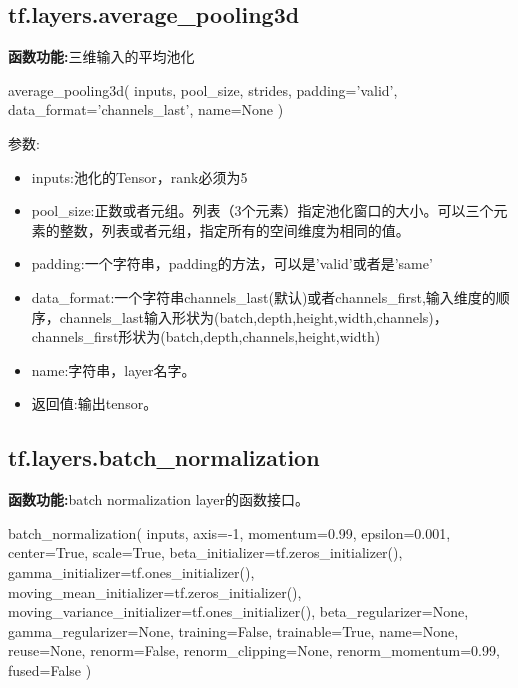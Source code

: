 \subsection{tf.layers.average\_pooling3d}
\textbf{函数功能:}三维输入的平均池化
\begin{python}
average_pooling3d(
    inputs,
    pool_size,
    strides,
    padding='valid',
    data_format='channels_last',
    name=None
)
\end{python}
参数:
\begin{itemize}
	\item inputs:池化的Tensor，rank必须为5
	\item pool\_size:正数或者元组。列表（3个元素）指定池化窗口的大小。可以三个元素的整数，列表或者元组，指定所有的空间维度为相同的值。
	\item padding:一个字符串，padding的方法，可以是'valid'或者是'same'
	\item data\_format:一个字符串channels\_last(默认)或者channels\_first,输入维度的顺序，channels\_last输入形状为(batch,depth,height,width,channels)，channels\_first形状为(batch,depth,channels,height,width)
	\item name:字符串，layer名字。
	\item 返回值:输出tensor。
\end{itemize}
\subsection{tf.layers.batch\_normalization}
\textbf{函数功能:}batch normalization layer的函数接口。
\begin{python}
batch_normalization(
    inputs,
    axis=-1,
    momentum=0.99,
    epsilon=0.001,
    center=True,
    scale=True,
    beta_initializer=tf.zeros_initializer(),
    gamma_initializer=tf.ones_initializer(),
    moving_mean_initializer=tf.zeros_initializer(),
    moving_variance_initializer=tf.ones_initializer(),
    beta_regularizer=None,
    gamma_regularizer=None,
    training=False,
    trainable=True,
    name=None,
    reuse=None,
    renorm=False,
    renorm_clipping=None,
    renorm_momentum=0.99,
    fused=False
)
\end{python}


